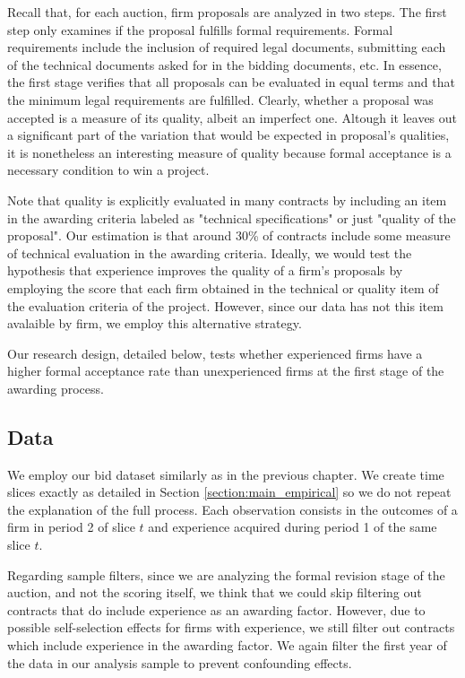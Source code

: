 Recall that, for each auction, firm proposals are analyzed in two steps. The first step only examines if the proposal fulfills formal requirements. Formal requirements include the inclusion of required legal documents, submitting each of the technical documents asked for in the bidding documents, etc. In essence, the first stage verifies that all proposals can be evaluated in equal terms and that the minimum legal requirements are fulfilled. Clearly, whether a proposal was accepted is a measure of its quality, albeit an imperfect one. Altough it leaves out a significant part of the variation that would be expected in proposal's qualities, it is nonetheless an interesting measure of quality because formal acceptance is a necessary condition to win a project.

Note that quality is explicitly evaluated in many contracts by including an item in the awarding criteria labeled as "technical specifications" or just "quality of the proposal". Our estimation is that around 30\% of contracts include some measure of technical evaluation in the awarding criteria.  Ideally, we would test the hypothesis that experience improves the quality of a firm's proposals by employing the score that each firm obtained in the technical or quality item of the evaluation criteria of the project. However, since our data has not this item avalaible by firm, we employ this alternative strategy.

Our research design, detailed below, tests whether experienced firms have a higher formal acceptance rate than unexperienced firms at the first stage of the awarding process.

\subsection{Data}
We employ our bid dataset similarly as in the previous chapter. We create time slices exactly as detailed in Section \ref{section:main_empirical} so we do not repeat the explanation of the full process.  Each observation consists in the outcomes of a firm in period 2 of slice $t$ and experience acquired during period 1 of the same slice $t$.

Regarding sample filters, since we are analyzing the formal revision stage of the auction, and not the scoring itself, we think that we could skip  filtering out contracts that do include experience as an awarding factor. However, due to possible self-selection effects for firms with experience, we still filter out contracts which include experience in the awarding factor. We again filter the first year of the data in our analysis sample to prevent confounding effects.

